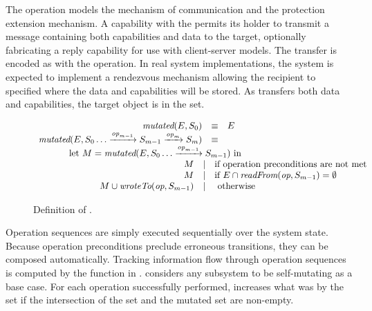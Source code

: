 The \NMsend{} operation models the mechanism of communication and the protection extension mechanism.
A capability with the \NMtx{} \TMaccessRight{} permits its holder to transmit a message containing both capabilities and data to the target, optionally fabricating a reply capability for use with client-server models.
The transfer is encoded as with the \NMcreate{} operation.
In real system implementations, the system is expected to implement a rendezvous mechanism allowing the recipient to specified where the data and capabilities will be stored.
As \NMsend{} transfers both data and capabilities, the target object is in the \NMwroteTo{} set.


\begin{figure}
  \[
  \begin{array}{rcl}
    \FNmutated{E}{S_0} & \equiv & E \\
    \FNmutated{E}{S_0 \FNopTail{\NMop_{m-1}}{S_{m-1}} \FNopHead{\NMop_m}{S_m} } & \equiv \\
    \multicolumn{3}{c}{
      \makebox[10 mm][l]{}
      \begin{array}{l}
        \text{let } M = \FNmutated{E}{S_0 \FNopTail{\NMop_{m-1}}{S_{m-1}}} \text{ in}\\
        \makebox[10 mm][l]{}
        \begin{array}{rcl}
          M & | & \text{if operation preconditions are not met} \\
          M & | & \text{if } E \cap \FNreadFrom{\ident{op}}{S_{m-1}} = \emptyset \\
          M \cup \FNwroteTo{\ident{op}}{S_{m-1}} & | & \text{ otherwise}
        \end{array}
      \end{array}
    }
  \end{array}
  \]
  \caption{Definition of \NMmutated{}.\label{fig:sketch:mutation}}
\end{figure}

Operation sequences are simply executed sequentially over the system state.
Because operation preconditions preclude erroneous transitions, they can be composed automatically.
Tracking information flow through operation sequences is computed by the \NMmutated{} function in .
\NMmutated{} considers any subsystem to be self-mutating as a base case.
For each operation successfully performed, \NMmutated{} increases what was \TMmutated{} by the \NMwroteTo{} set if the intersection of the \NMreadFrom{} set and the mutated set are non-empty.

